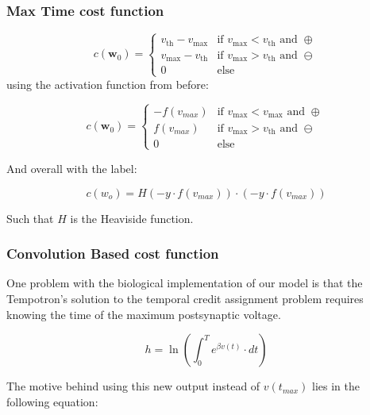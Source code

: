 \subsubsection{Max Time cost function}


\begin{equation}
    c(\mathbf{w}_0) = \begin{cases}
    v_{\text{th}} - v_{\text{max}} & \text{if } v_{\text{max}} < v_{\text{th}} \text{ and } \oplus \\
    v_{\text{max}} - v_{\text{th}} & \text{if } v_{\text{max}} > v_{\text{th}} \text{ and } \ominus \\
    0 & \text{else}
    \end{cases}
\end{equation}
using the activation function from before:

\begin{equation}
    c(\mathbf{w}_0) = \begin{cases}
    -f(v_{max}) & \text{if } v_{\text{max}} < v_{\text{max}} \text{ and } \oplus \\
    f(v_{max}) & \text{if } v_{\text{max}} > v_{\text{th}} \text{ and } \ominus \\
    0 & \text{else}
    \end{cases}
\end{equation}

And overall with the label:

\begin{equation}
    c(w_o) = H(-y \cdot f(v_{max})) \cdot (-y \cdot f(v_{max}))
\end{equation}

Such that $H$ is the Heaviside function.

\subsubsection{Convolution Based cost function}

One problem with the biological implementation of our model is that the Tempotron’s solution to the temporal credit assignment problem requires knowing the time of the maximum postsynaptic voltage.

\begin{equation}
    h = \ln(\int_{0}^{T} e^{\beta v(t)} \cdot dt)
\end{equation}

 The motive behind using this new output instead of $v(t_{max})$ lies in the following equation:


